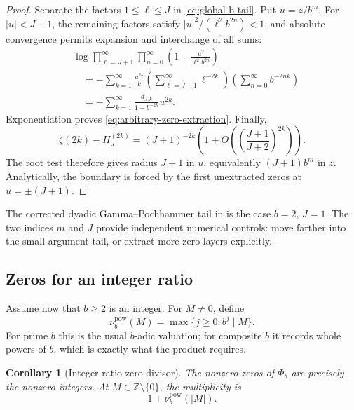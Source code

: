 \documentclass[11pt,oneside]{article}
\numberwithin{equation}{section}
\newtheorem{corollary}[theorem]{Corollary}
\theoremstyle{definition}
\theoremstyle{remark}
\newcommand{\Z}{\mathbb Z}
\begin{document}
\begin{proof}
Separate the factors \(1\le\ell\le J\) in
\eqref{eq:global-b-tail}.  Put \(u=z/b^m\).  For \(|u|<J+1\), the remaining factors
satisfy \(|u|^2/(\ell^2b^{2n})<1\), and absolute convergence permits expansion and
interchange of all sums:
\begin{align*}
 &\log\prod_{\ell=J+1}^{\infty}\prod_{n=0}^{\infty}
 \left(1-\frac{u^2}{\ell^2b^{2n}}\right)\\
 &\quad=-\sum_{k=1}^{\infty}\frac{u^{2k}}{k}
   \left(\sum_{\ell=J+1}^{\infty}\ell^{-2k}\right)
   \left(\sum_{n=0}^{\infty}b^{-2nk}\right)\\
 &\quad=-\sum_{k=1}^{\infty}
   \frac{d_{J,k}}{1-b^{-2k}}u^{2k}.
\end{align*}
Exponentiation proves \eqref{eq:arbitrary-zero-extraction}.  Finally,
\[
 \zeta(2k)-H_J^{(2k)}
 =(J+1)^{-2k}\left(1+O\!\left(
   \left(\frac{J+1}{J+2}\right)^{2k}\right)\right).
\]
The root test therefore gives radius \(J+1\) in \(u\), equivalently
\((J+1)b^m\) in \(z\).  Analytically, the boundary is forced by the first unextracted
zeros at \(u=\pm(J+1)\).
\end{proof}

The corrected dyadic Gamma--Pochhammer tail in  is the case
\(b=2\), \(J=1\).  The two indices \(m\) and \(J\) provide independent numerical controls:
move farther into the small-argument tail, or extract more zero layers explicitly.

\subsection{Zeros for an integer ratio}

Assume now that \(b\ge2\) is an integer.  For \(M\ne0\), define
\begin{equation}
 \nu_b^{\mathrm{pow}}(M)
 =\max\{j\ge0:b^j\mid M\}.
 \label{eq:power-valuation}
\end{equation}
For prime \(b\) this is the usual \(b\)-adic valuation; for composite \(b\) it records
whole powers of \(b\), which is exactly what the product requires.

\begin{corollary}[Integer-ratio zero divisor]
\label{cor:b-zero-divisor}
The nonzero zeros of \(\Phi_b\) are precisely the nonzero integers.  At
\(M\in\Z\setminus\{0\}\), the multiplicity is
\begin{equation}
 1+\nu_b^{\mathrm{pow}}(|M|).
 \label{eq:b-zero-order}
\end{equation}
\end{corollary}
\end{document}
